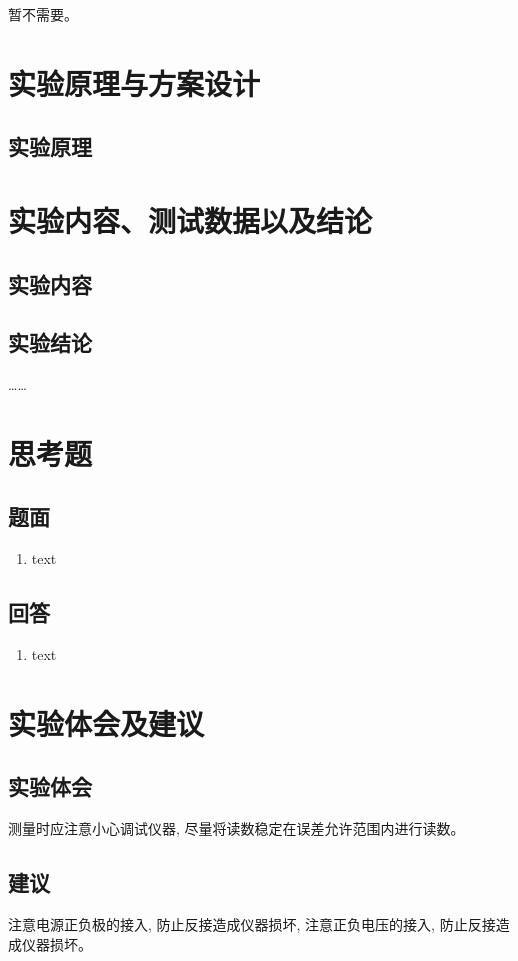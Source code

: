 \documentclass[10pt, a4paper]{article} %
\begin{document}
暂不需要。

\section{实验原理与方案设计}
\subsection{实验原理}
\section{实验内容、测试数据以及结论}

\subsection{实验内容}

\subsection{实验结论}
……
\section{思考题}
\subsection{题面}
\begin{enumerate}[leftmargin=50pt,label=(\arabic*)] %
    \item text

\end{enumerate}
\subsection{回答}

\begin{enumerate}[leftmargin=50pt,label=(\arabic*)] %
    \item text
\end{enumerate}

\section{实验体会及建议}
\subsection{实验体会}
测量时应注意小心调试仪器, 尽量将读数稳定在误差允许范围内进行读数。
\subsection{建议}
注意电源正负极的接入, 防止反接造成仪器损坏, 注意正负电压的接入, 防止反接造成仪器损坏。
\end{document}
